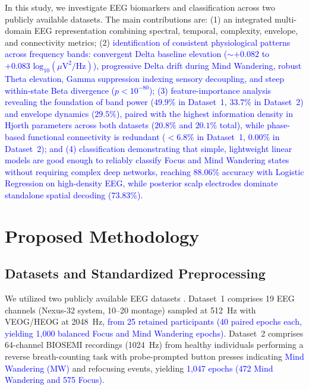 \documentclass[conference]{IEEEtran}
\begin{document}
In this study, we investigate EEG biomarkers and classification across two publicly available datasets. The main contributions are: (1) an integrated multi-domain EEG representation combining spectral, temporal, complexity, envelope, and connectivity metrics; (2) \textcolor{blue}{identification of consistent physiological patterns across frequency bands: convergent Delta baseline elevation ($\sim+0.082$ to $+0.083\text{ log}_{10}(\mu\text{V}^2/\text{Hz})$), progressive Delta drift during Mind Wandering, robust Theta elevation, Gamma suppression indexing sensory decoupling, and steep within-state Beta divergence ($p < 10^{-80}$); (3) feature-importance analysis revealing the foundation of band power ($49.9\%$ in Dataset~1, $33.7\%$ in Dataset~2) and envelope dynamics ($29.5\%$), paired with the highest information density in Hjorth parameters across both datasets ($20.8\%$ and $20.1\%$ total), while phase-based functional connectivity is redundant ($<6.8\%$ in Dataset~1, $0.00\%$ in Dataset~2); and (4) classification demonstrating that simple, lightweight linear models are good enough to reliably classify Focus and Mind Wandering states without requiring complex deep networks, reaching $88.06\%$ accuracy with Logistic Regression on high-density EEG, while posterior scalp electrodes dominate standalone spatial decoding ($73.83\%$)}.



\section{Proposed Methodology}

\subsection{Datasets and Standardized Preprocessing}

We utilized two publicly available EEG datasets \cite{grandchamp2014oculometric,rodlarios}. Dataset~1 \cite{rodlarios} comprises 19 EEG channels (Nexus-32 system, 10--20 montage) sampled at 512~Hz with VEOG/HEOG at 2048~Hz\textcolor{blue}{, from 25 retained participants (40 paired epochs each, yielding 1,000 balanced Focus and Mind Wandering epochs)}. Dataset~2 \cite{grandchamp2014oculometric} comprises 64-channel BIOSEMI recordings (1024~Hz) from healthy individuals performing a reverse breath-counting task with probe-prompted button presses indicating \textcolor{blue}{Mind Wandering (MW)} and refocusing events, yielding \textcolor{blue}{1,047 epochs (472 Mind Wandering and 575 Focus)}.
\end{document}
